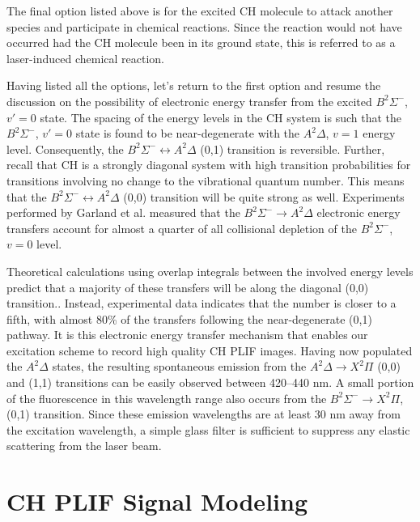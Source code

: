 The final option listed above is for the excited CH molecule to attack another species and participate in chemical reactions.
Since the reaction would not have occurred had the CH molecule been in its ground state, this is referred to as a laser-induced chemical reaction.

Having listed all the options, let's return to the first option and resume the discussion on the possibility of electronic energy transfer from the excited \(B^2\Sigma^-\), \(v'=0\) state.
The spacing of the energy levels in the CH system is such that the \(B^2\Sigma^-\), \(v'=0\) state is found to be near-degenerate with the \(A^2\Delta\), \(v=1\) energy level.
Consequently, the \(B^2\Sigma^-\leftrightarrow A^2\Delta\) (0,1) transition is reversible.
Further, recall that CH is a strongly diagonal system with high transition probabilities for transitions involving no change to the vibrational quantum number.
This means that the \(B^2\Sigma^-\leftrightarrow A^2\Delta\) (0,0) transition will be quite strong as well.
Experiments performed by Garland et al.\cite{1985-garland-b} measured that the \(B^2\Sigma^-\rightarrow A^2\Delta\) electronic energy transfers account for almost a quarter of all collisional depletion of the \(B^2\Sigma^-\), \(v=0\) level.

Theoretical calculations using overlap integrals between the involved energy levels predict that a majority of these transfers will be along the diagonal (0,0) transition.\cite{2000-luque}.
Instead, experimental data indicates that the number is closer to a fifth, with almost 80\% of the transfers following the near-degenerate (0,1) pathway.
It is this electronic energy transfer mechanism that enables our excitation scheme to record high quality CH PLIF images.
Having now populated the \(A^2\Delta\) states, the resulting spontaneous emission from the \(A^2\Delta\rightarrow X^2\Pi\) (0,0) and (1,1) transitions can be easily observed between 420--440 nm.
A small portion of the fluorescence in this wavelength range also occurs from the \(B^2\Sigma^-\rightarrow X^2\Pi\), (0,1) transition.
Since these emission wavelengths are at least 30 nm away from the excitation wavelength, a simple glass filter is sufficient to suppress any elastic scattering from the laser beam.

\section{CH PLIF Signal Modeling}
\label{sec:chplifsignalmodel}

